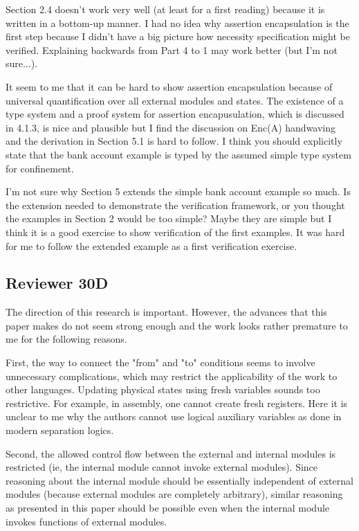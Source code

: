 \documentclass[11pt]{amsart}
\begin{document}
Section 2.4 doesn't work very well (at least for a first reading)
because it is written in a bottom-up manner.  I had no idea why
assertion encapsulation is the first step because I didn't have a big
picture how necessity specification might be verified.  Explaining backwards from Part 4 to 1
may work better (but I'm not sure...).

It seem to me that it can be hard to show assertion encapsulation
because of universal quantification over all external modules and
states.  The existence of a type system and a proof system for
assertion encapusulation, which is discussed in 4.1.3, is nice and
plausible but I find the discussion on Enc(A) handwaving and the
derivation in Section 5.1 is hard to follow.  I think you should
explicitly state that the bank account example is typed by the assumed
simple type system for confinement.

I'm not sure why Section 5 extends the simple bank account example so
much.  Is the extension needed to demonstrate the verification
framework, or you thought the examples in Section 2 would be too simple? 
Maybe they are simple but I think it is a good exercise to show verification of the first examples. 
It was hard for me to follow the extended example as a first verification exercise.

 \subsection*{Reviewer 30D}
 
The direction of this research is important. However, the advances that this paper makes do not seem strong enough and the work looks rather premature to me for the following reasons.

First, the way to connect the "from" and "to" conditions seems to involve unnecessary complications, which may restrict the applicability of the work to other languages. Updating physical states using fresh variables sounds too restrictive. For example, in assembly, one cannot create fresh registers. Here it is unclear to me why the authors cannot use logical auxiliary variables as done in modern separation logics.

Second, the allowed control flow between the external and internal modules is restricted (ie, the internal module cannot invoke external modules). Since reasoning about the internal module should be essentially independent of external modules (because external modules are completely arbitrary), similar reasoning as presented in this paper should be possible even when the internal module invokes functions of external modules.
\end{document}
